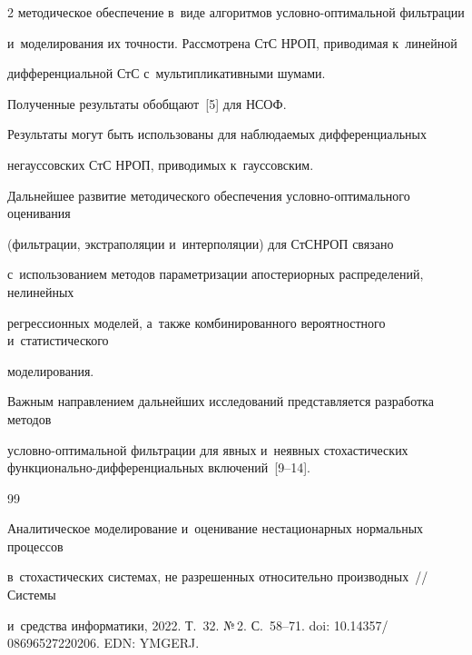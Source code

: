 \begin{multicols}{2}
методическое обеспечение в~виде алгоритмов услов\-но-оп\-ти\-маль\-ной фильт\-ра\-ции 

и~моделирования их точ\-ности. Рассмотрена СтС НРОП, приводимая к~линейной 

дифференциальной СтС с~мультипликативными шумами.

Полученные результаты обобщают~[5] для НСОФ.

Результаты могут быть использованы для наблюда\-емых дифференциальных 

негауссовских СтС НРОП, приводимых к~гауссовским.



Дальнейшее развитие методического обеспечения услов\-но-оп\-ти\-маль\-но\-го оценивания 

(фильтрации, экстраполяции и~интерполяции) для СтС\linebreak НРОП связано 

с~использованием методов па\-ра\-мет\-ри\-за\-ции апостериорных распределений, нелинейных 

регрессионных моделей, а~также комбинированного вероятностного и~статистического 

\mbox{моделирования}.



Важным направлением дальнейших исследований представляется разработка методов 

услов\-но-оп\-ти\-маль\-ной фильт\-ра\-ции для явных и~\mbox{неявных} стохастических функ\-ци\-о\-наль\-но-диф\-фе\-рен\-ци\-аль\-ных включений~[9--14].



{\small\frenchspacing

 {\baselineskip=10.6pt


 \begin{thebibliography}{99}   



\vspace*{-2pt}






Аналитическое моделирование и~оценивание нестационарных нормальных процессов 

в~стохастических сис\-те\-мах, не разрешенных относительно производных~// Сис\-те\-мы 

и~средства информатики, 2022. Т.~32.  №\,2. С.~58--71. doi: 10.14357/ 08696527220206. EDN: YMGERJ.




\end{thebibliography}}}
\end{multicols}
